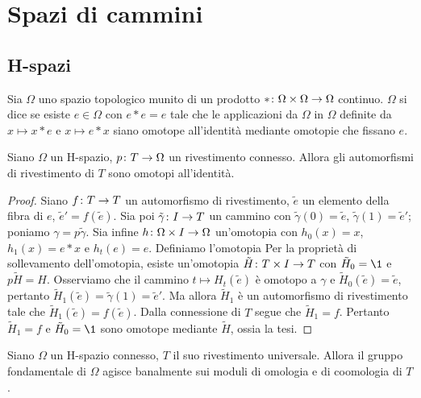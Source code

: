 \chapter{Spazi di cammini}
\label{ch:path-spaces}
\section{H-spazi}
\begin{definition}
Sia \(\Omega\) uno spazio topologico munito di un prodotto \(\map{\ast}{\Omega\times \Omega}{\Omega}\) continuo. \(\Omega\) si dice  se esiste \(e\in \Omega\) con \(e\ast e=e\) tale che le applicazioni da \(\Omega\) in \(\Omega\) definite da \(x\mapsto x\ast e\) e \(x\mapsto e\ast x\) siano omotope all'identità mediante omotopie che fissano \(e\).
\end{definition}
\begin{proposition}
Siano \(\Omega\) un H-spazio, \(\map{p}{T}{\Omega}\) un rivestimento connesso. Allora gli automorfismi di rivestimento di \(T\) sono omotopi all'identità.
\end{proposition}
\begin{proof}
Siano \(\map{f}{T}{T}\) un automorfismo di rivestimento, \(\tilde{e}\) un elemento della fibra di \(e\), \(\tilde{e}'=f(\tilde{e})\). Sia poi \(\map{\tilde\gamma}{I}{T}\) un cammino con \(\tilde\gamma(0)=\tilde{e}\), \(\tilde\gamma(1)=\tilde{e}'\); poniamo \(\gamma=p\tilde\gamma\). Sia infine \(\map{h}{\Omega\times I}{\Omega}\) un'omotopia con \(h_0(x)=x\), \(h_1(x)=e\ast x\) e \(h_t(e)=e\). Definiamo l'omotopia
Per la proprietà di sollevamento dell'omotopia, esiste un'omotopia \(\map{\tilde{H}}{T\times I}{T}\) con \(\tilde{H}_0=\1\) e \(p\tilde{H}=H\). Osserviamo che il cammino \(t\mapsto H_t(\tilde{e})\) è omotopo a \(\gamma\) e \(\tilde{H}_0(\tilde{e})=\tilde{e}\), pertanto \(\tilde{H}_1(\tilde{e})=\tilde{\gamma}(1)=\tilde{e}'\). Ma allora \(\tilde{H}_1\) è un automorfismo di rivestimento tale che \(\tilde{H}_1(\tilde{e})=f(\tilde{e})\). Dalla connessione di \(T\) segue che \(\tilde{H}_1=f\). Pertanto \(\tilde{H}_1=f\) e \(\tilde{H}_0=\1\) sono omotope mediante \(\tilde H\), ossia la tesi.
\end{proof}
\begin{corollary}
Siano \(\Omega\) un H-spazio connesso, \(T\) il suo rivestimento universale. Allora il gruppo fondamentale di \(\Omega\) agisce banalmente sui moduli di omologia e di coomologia di \(T\).
\end{corollary}

